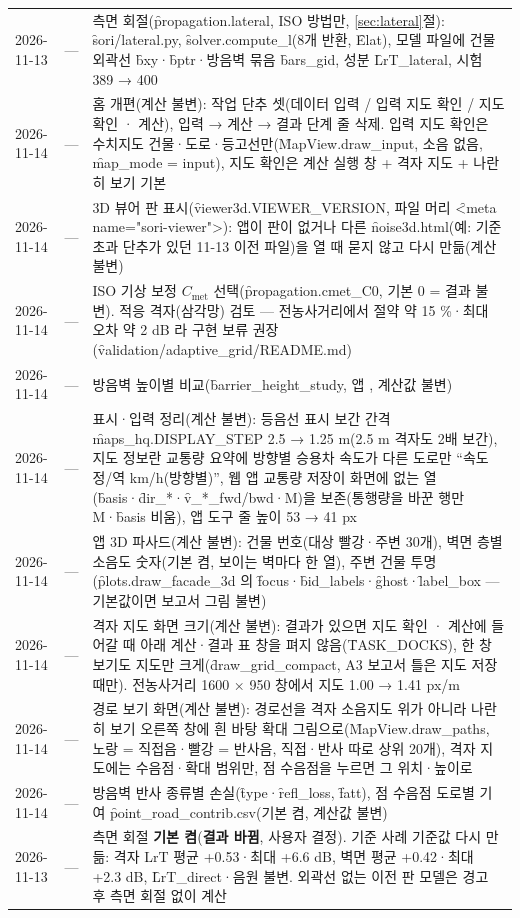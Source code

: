 \documentclass[10.5pt,a4paper]{article}
\begin{document}
\begin{longtable}{P{22mm}P{24mm}P{106mm}}
2026-11-13 & — & 측면 회절(\f{propagation.lateral}, ISO 방법만, \ref{sec:lateral}절): \f{sori/lateral.py}, \f{solver.compute\_l}(8개 반환, \f{Elat}), 모델 파일에 건물 외곽선 \f{bxy}·\f{bptr}·방음벽 묶음 \f{bars\_gid}, 성분 \f{LrT\_lateral}, 시험 389 → 400 \\
2026-11-14 & — & 홈 개편(계산 불변): 작업 단추 셋(데이터 입력 / 입력 지도 확인 / 지도 확인 · 계산), 입력 → 계산 → 결과 단계 줄 삭제. 입력 지도 확인은 수치지도 건물·도로·등고선만(\f{MapView.draw\_input}, 소음 없음, \f{map\_mode = input}), 지도 확인은 계산 실행 창 + 격자 지도 + 나란히 보기 기본 \\
2026-11-14 & — & 3D 뷰어 판 표시(\f{viewer3d.VIEWER\_VERSION}, 파일 머리 \f{<meta name="sori-viewer">}): 앱이 판이 없거나 다른 \f{noise3d.html}(예: 기준 초과 단추가 있던 11-13 이전 파일)을 열 때 묻지 않고 다시 만듦(계산 불변) \\
2026-11-14 & — & ISO 기상 보정 $C_\mathrm{met}$ 선택(\f{propagation.cmet\_C0}, 기본 0 = 결과 불변). 적응 격자(삼각망) 검토 — 전농사거리에서 절약 약 15 \%·최대 오차 약 2 dB 라 구현 보류 권장(\f{validation/adaptive\_grid/README.md}) \\
2026-11-14 & — & 방음벽 높이별 비교(\f{barrier\_height\_study}, 앱 , 계산값 불변) \\
2026-11-14 & — & 표시·입력 정리(계산 불변): 등음선 표시 보간 간격 \f{maps\_hq.DISPLAY\_STEP} 2.5 → 1.25 m(2.5 m 격자도 2배 보간), 지도 정보란 교통량 요약에 방향별 승용차 속도가 다른 도로만 ``속도 정/역 km/h(방향별)'', 웹 앱 교통량 저장이 화면에 없는 열(\f{basis}·\f{dir\_*}·\f{v\_*\_fwd/bwd}·M)을 보존(통행량을 바꾼 행만 M·\f{basis} 비움), 앱 도구 줄 높이 53 → 41 px \\
2026-11-14 & — & 앱 3D 파사드(계산 불변): 건물 번호(대상 빨강·주변 30개), 벽면 층별 소음도 숫자(기본 켬, 보이는 벽마다 한 열), 주변 건물 투명(\f{plots.draw\_facade\_3d} 의 \f{focus}·\f{bid\_labels}·\f{ghost}·\f{label\_box} — 기본값이면 보고서 그림 불변) \\
2026-11-14 & — & 격자 지도 화면 크기(계산 불변): 결과가 있으면 지도 확인 · 계산에 들어갈 때 아래 계산·결과 표 창을 펴지 않음(\f{TASK\_DOCKS}), 한 창 보기도 지도만 크게(\f{draw\_grid\_compact}, A3 보고서 틀은 지도 저장 때만). 전농사거리 1600 × 950 창에서 지도 1.00 → 1.41 px/m \\
2026-11-14 & — & 경로 보기 화면(계산 불변): 경로선을 격자 소음지도 위가 아니라 나란히 보기 오른쪽 창에 흰 바탕 확대 그림으로(\f{MapView.draw\_paths}, 노랑 = 직접음·빨강 = 반사음, 직접·반사 따로 상위 20개), 격자 지도에는 수음점·확대 범위만, 점 수음점을 누르면 그 위치·높이로 \\
2026-11-14 & — & 방음벽 반사 종류별 손실(\f{type}·\f{refl\_loss}, \f{fatt}), 점 수음점 도로별 기여 \f{point\_road\_contrib.csv}(기본 켬, 계산값 불변) \\
2026-11-13 & — & 측면 회절 \textbf{기본 켬}(\textbf{결과 바뀜}, 사용자 결정). 기준 사례 기준값 다시 만듦: 격자 LrT 평균 +0.53·최대 +6.6 dB, 벽면 평균 +0.42·최대 +2.3 dB, \f{LrT\_direct}·음원 불변. 외곽선 없는 이전 판 모델은 경고 후 측면 회절 없이 계산 \\
\bottomrule
\end{longtable}
\end{document}
